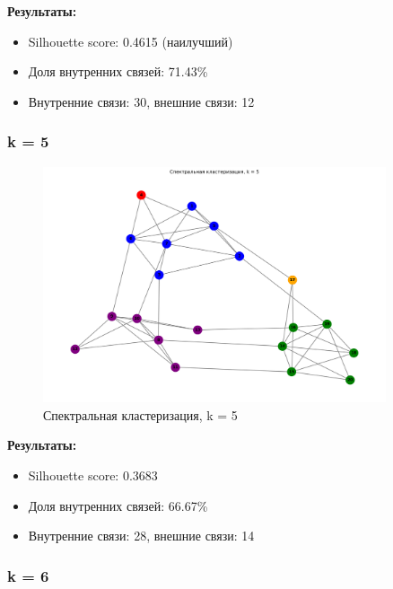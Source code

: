 \textbf{Результаты:}
\begin{itemize}
    \item Silhouette score: 0.4615 (наилучший)
    \item Доля внутренних связей: 71.43\%
    \item Внутренние связи: 30, внешние связи: 12
\end{itemize}

\subsubsection*{k = 5}

\begin{figure}[H]
    \centering
    \includegraphics[width=0.9\textwidth]{images/task1/clustering_k5.png}
    \caption{Спектральная кластеризация, k = 5}
\end{figure}

\textbf{Результаты:}
\begin{itemize}
    \item Silhouette score: 0.3683
    \item Доля внутренних связей: 66.67\%
    \item Внутренние связи: 28, внешние связи: 14
\end{itemize}

\subsubsection*{k = 6}


